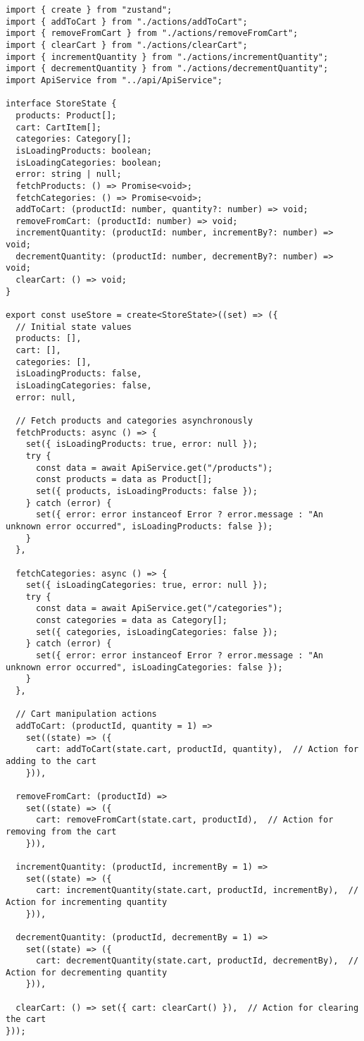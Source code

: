 \begin{verbatim}
import { create } from "zustand";
import { addToCart } from "./actions/addToCart";
import { removeFromCart } from "./actions/removeFromCart";
import { clearCart } from "./actions/clearCart";
import { incrementQuantity } from "./actions/incrementQuantity";
import { decrementQuantity } from "./actions/decrementQuantity";
import ApiService from "../api/ApiService";

interface StoreState {
  products: Product[];
  cart: CartItem[];
  categories: Category[];
  isLoadingProducts: boolean;
  isLoadingCategories: boolean;
  error: string | null;
  fetchProducts: () => Promise<void>;
  fetchCategories: () => Promise<void>;
  addToCart: (productId: number, quantity?: number) => void;
  removeFromCart: (productId: number) => void;
  incrementQuantity: (productId: number, incrementBy?: number) => void;
  decrementQuantity: (productId: number, decrementBy?: number) => void;
  clearCart: () => void;
}

export const useStore = create<StoreState>((set) => ({
  // Initial state values
  products: [],
  cart: [],
  categories: [],
  isLoadingProducts: false,
  isLoadingCategories: false,
  error: null,

  // Fetch products and categories asynchronously
  fetchProducts: async () => {
    set({ isLoadingProducts: true, error: null });
    try {
      const data = await ApiService.get("/products");
      const products = data as Product[];
      set({ products, isLoadingProducts: false });
    } catch (error) {
      set({ error: error instanceof Error ? error.message : "An unknown error occurred", isLoadingProducts: false });
    }
  },

  fetchCategories: async () => {
    set({ isLoadingCategories: true, error: null });
    try {
      const data = await ApiService.get("/categories");
      const categories = data as Category[];
      set({ categories, isLoadingCategories: false });
    } catch (error) {
      set({ error: error instanceof Error ? error.message : "An unknown error occurred", isLoadingCategories: false });
    }
  },

  // Cart manipulation actions
  addToCart: (productId, quantity = 1) =>
    set((state) => ({
      cart: addToCart(state.cart, productId, quantity),  // Action for adding to the cart
    })),

  removeFromCart: (productId) =>
    set((state) => ({
      cart: removeFromCart(state.cart, productId),  // Action for removing from the cart
    })),

  incrementQuantity: (productId, incrementBy = 1) =>
    set((state) => ({
      cart: incrementQuantity(state.cart, productId, incrementBy),  // Action for incrementing quantity
    })),

  decrementQuantity: (productId, decrementBy = 1) =>
    set((state) => ({
      cart: decrementQuantity(state.cart, productId, decrementBy),  // Action for decrementing quantity
    })),

  clearCart: () => set({ cart: clearCart() }),  // Action for clearing the cart
}));
\end{verbatim}

